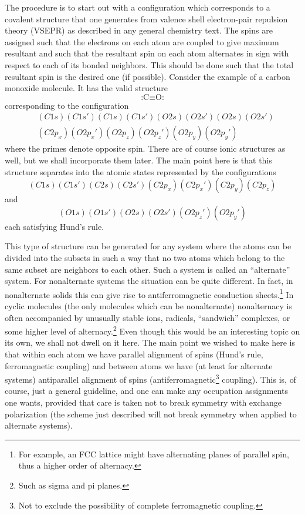 \documentclass[12pt,letterpaper]{report}
\begin{document}
The procedure is to start out with a configuration which corresponds to a covalent structure that one generates from valence shell electron-pair repulsion theory (VSEPR) as described in any general chemistry text. The spins are assigned such that the electrons on each atom are coupled to give maximum resultant and such that the resultant spin on each atom alternates in sign with respect to each of its bonded neighbors. This should be done such that the total resultant spin is the desired one (if possible). Consider the example of a carbon monoxide molecule. It has the valid structure
\begin{equation}
\text{:C} \equiv \text{O:}
\end{equation}
corresponding to the configuration
\begin{align}
&(C1s)(C1s')(C1s)(C1s')(O2s)(O2s')(O2s)(O2s')\nonumber\\
&(C2p_x)(O2p_x')(O2p_z)(O2p_z')(O2p_y)(O2p_y')
\end{align}
where the primes denote opposite spin. There are of course ionic structures as well, but we shall incorporate them later. The main point here is that this structure separates into the atomic states represented by the configurations
\begin{equation}
(C1s)(C1s')(C2s)(C2s')(C2p_x)(C2p_x')(C2p_y)(C2p_z)
\end{equation}
and
\begin{equation}
(O1s)(O1s')(O2s)(O2s')(O2p_z')(O2p_y')
\end{equation}
each satisfying Hund's rule.

This type of structure can be generated for any system where the atoms can be divided into the subsets in such a way that no two atoms which belong to the same subset are neighbors to each other. Such a system is called an ``alternate'' system. For nonalternate systems the situation can be quite different. In fact, in nonalternate solids this can give rise to antiferromagnetic conduction sheets.\footnote{For example, an FCC lattice might have alternating planes of parallel spin, thus a higher order of alternacy.} In cyclic molecules (the only molecules which can be nonalternate) nonalternacy is often accompanied by unusually stable ions, radicals, ``sandwich'' complexes, or some higher level of alternacy.\footnote{Such as sigma and pi planes.} Even though this would be an interesting topic on its own, we shall not dwell on it here. The main point we wished to make here is that within each atom we have parallel alignment of spins (Hund's rule, ferromagnetic coupling) and between atoms we have (at least for alternate systems) antiparallel alignment of spins (antiferromagnetic\footnote{Not to exclude the possibility of complete ferromagnetic coupling.} coupling). This is, of course, just a general guideline, and one can make any occupation assignments one wants, provided that care is taken not to break symmetry with exchange polarization (the scheme just described will not break symmetry when applied to alternate systems).
\end{document}
